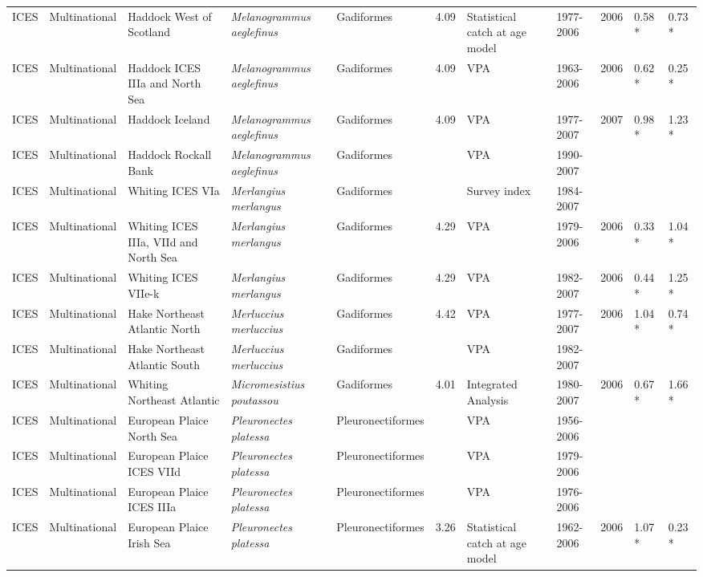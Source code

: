 \begin{longtable}{p{1.5cm}p{1.5cm}p{3cm}p{3cm}p{2.5cm}p{0.9cm}p{1.4cm}p{0.9cm}p{0.9cm}p{0.9cm}p{1cm}}
  ICES & Multinational & Haddock West of Scotland & \textit{Melanogrammus aeglefinus} & Gadiformes & 4.09 & Statistical catch at age model & 1977-2006 & 2006 & 0.58 * & 0.73 * \\ 
  ICES & Multinational & Haddock ICES IIIa and North Sea & \textit{Melanogrammus aeglefinus} & Gadiformes & 4.09 & VPA & 1963-2006 & 2006 & 0.62 * & 0.25 * \\ 
  ICES & Multinational & Haddock Iceland & \textit{Melanogrammus aeglefinus} & Gadiformes & 4.09 & VPA & 1977-2007 & 2007 & 0.98 * & 1.23 * \\ 
  ICES & Multinational & Haddock Rockall Bank & \textit{Melanogrammus aeglefinus} & Gadiformes &  & VPA & 1990-2007 &  &  &  \\ 
  ICES & Multinational & Whiting ICES VIa & \textit{Merlangius merlangus} & Gadiformes &  & Survey index & 1984-2007 &  &  &  \\ 
  ICES & Multinational & Whiting ICES IIIa, VIId and North Sea & \textit{Merlangius merlangus} & Gadiformes & 4.29 & VPA & 1979-2006 & 2006 & 0.33 * & 1.04 * \\ 
  ICES & Multinational & Whiting ICES VIIe-k & \textit{Merlangius merlangus} & Gadiformes & 4.29 & VPA & 1982-2007 & 2006 & 0.44 * & 1.25 * \\ 
  ICES & Multinational & Hake Northeast Atlantic North & \textit{Merluccius merluccius} & Gadiformes & 4.42 & VPA & 1977-2007 & 2006 & 1.04 * & 0.74 * \\ 
  ICES & Multinational & Hake Northeast Atlantic South & \textit{Merluccius merluccius} & Gadiformes &  & VPA & 1982-2007 &  &  &  \\ 
  ICES & Multinational & Whiting Northeast Atlantic & \textit{Micromesistius poutassou} & Gadiformes & 4.01 & Integrated Analysis & 1980-2007 & 2006 & 0.67 * & 1.66 * \\ 
  ICES & Multinational & European Plaice North Sea & \textit{Pleuronectes platessa} & Pleuronectiformes &  & VPA & 1956-2006 &  &  &  \\ 
  ICES & Multinational & European Plaice ICES VIId & \textit{Pleuronectes platessa} & Pleuronectiformes &  & VPA & 1979-2006 &  &  &  \\ 
  ICES & Multinational & European Plaice ICES IIIa & \textit{Pleuronectes platessa} & Pleuronectiformes &  & VPA & 1976-2006 &  &  &  \\ 
  ICES & Multinational & European Plaice Irish Sea & \textit{Pleuronectes platessa} & Pleuronectiformes & 3.26 & Statistical catch at age model & 1962-2006 & 2006 & 1.07 * & 0.23 * \\ 

\end{longtable}
